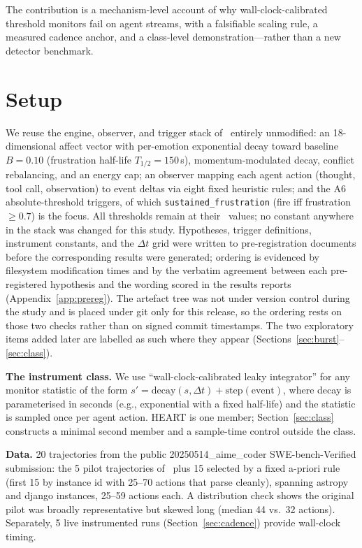 The contribution is a mechanism-level account of why wall-clock-calibrated
threshold monitors fail on agent streams, with a falsifiable scaling rule, a
measured cadence anchor, and a class-level demonstration---rather than a new
detector benchmark.

\section{Setup}
\label{sec:setup}

We reuse the engine, observer, and trigger stack of~\cite{P1} entirely
unmodified: an 18-dimensional affect vector with per-emotion exponential decay
toward baseline $B = 0.10$ (frustration half-life $T_{1/2} = 150$\,s),
momentum-modulated decay, conflict rebalancing, and an energy cap; an observer
mapping each agent action (thought, tool call, observation) to event deltas via
eight fixed heuristic rules; and the A6 absolute-threshold triggers, of which
\texttt{sustained\_frustration} (fire iff frustration $\ge 0.7$) is the focus.
All thresholds remain at their~\cite{P1} values; no constant anywhere in the
stack was changed for this study. Hypotheses, trigger definitions, instrument
constants, and the $\Delta t$ grid were written to pre-registration documents
before the corresponding results were generated; ordering is evidenced by
filesystem modification times and by the verbatim agreement between each
pre-registered hypothesis and the wording scored in the results reports
(Appendix~\ref{app:prereg}). The artefact tree was not under version control
during the study and is placed under git only for this release, so the ordering
rests on those two checks rather than on signed commit timestamps. The two
exploratory items added later are labelled as such where they appear
(Sections~\ref{sec:burst}--\ref{sec:class}).

\textbf{The instrument class.} We use ``wall-clock-calibrated leaky integrator''
for any monitor statistic of the form $s' = \mathrm{decay}(s, \Delta t) +
\mathrm{step}(\text{event})$, where decay is parameterised in seconds (e.g.,
exponential with a fixed half-life) and the statistic is sampled once per agent
action. HEART is one member; Section~\ref{sec:class} constructs a minimal second
member and a sample-time control outside the class.

\textbf{Data.} 20 trajectories from the public 20250514\_aime\_coder
SWE-bench-Verified submission: the 5 pilot trajectories of~\cite{P1} plus 15
selected by a fixed a-priori rule (first 15 by instance id with 25--70 actions
that parse cleanly), spanning astropy and django instances, 25--59 actions each.
A distribution check shows the original pilot was broadly representative but
skewed long (median 44 vs.\ 32 actions). Separately, 5 live instrumented runs
(Section~\ref{sec:cadence}) provide wall-clock timing.

